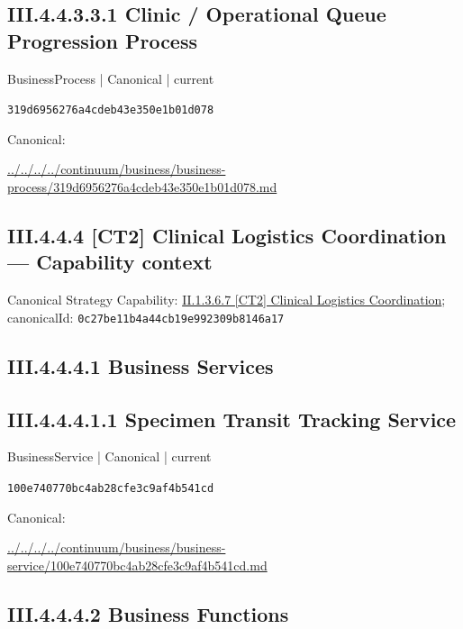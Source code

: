 \documentclass[10pt,a4paper]{article}
\begin{document}
\subsection*{III.4.4.3.3.1 Clinic / Operational Queue Progression Process}
\label{element-319d6956276a4cdeb43e350e1b01d078}
{\small BusinessProcess | Canonical | current}\par
\texttt{319d6956276a4cdeb43e350e1b01d078}\par
Canonical: \par
{\footnotesize\url{../../../../continuum/business/business-process/319d6956276a4cdeb43e350e1b01d078.md}}\par
\subsection*{III.4.4.4 [CT2] Clinical Logistics Coordination — Capability context}
Canonical Strategy Capability: \hyperref[element-0c27be11b4a44cb19e992309b8146a17]{II.1.3.6.7 [CT2] Clinical Logistics Coordination}; canonicalId: \texttt{0c27be11b4a44cb19e992309b8146a17}\par
\subsection*{III.4.4.4.1 Business Services}
\subsection*{III.4.4.4.1.1 Specimen Transit Tracking Service}
\label{element-100e740770bc4ab28cfe3c9af4b541cd}
{\small BusinessService | Canonical | current}\par
\texttt{100e740770bc4ab28cfe3c9af4b541cd}\par
Canonical: \par
{\footnotesize\url{../../../../continuum/business/business-service/100e740770bc4ab28cfe3c9af4b541cd.md}}\par
\subsection*{III.4.4.4.2 Business Functions}
\end{document}
